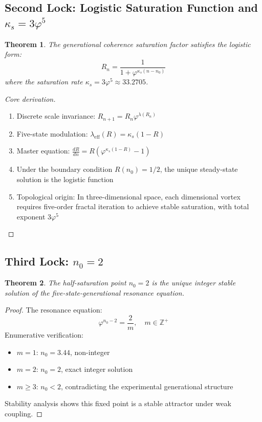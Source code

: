 \documentclass[12pt,a4paper,twocolumn]{article}
\renewcommand{\phi}{\varphi}
\newtheorem{theorem}{Theorem}[section]
\begin{document}
\subsection{Second Lock: Logistic Saturation Function and $\kappa_s=3\phi^5$}
\begin{theorem}
The generational coherence saturation factor satisfies the logistic form:
\[
R_n = \frac{1}{1+\phi^{\kappa_s(n-n_0)}}
\]
where the saturation rate $\kappa_s = 3\phi^5 \approx 33.2705$.
\end{theorem}

\begin{proof}[Core derivation]
\begin{enumerate}
\item Discrete scale invariance: $R_{n+1} = R_n \phi^{\lambda(R_n)}$
\item Five-state modulation: $\lambda_{\text{eff}}(R) = \kappa_s(1-R)$
\item Master equation: $\displaystyle \frac{dR}{dn} = R(\phi^{\kappa_s(1-R)}-1)$
\item Under the boundary condition $R(n_0)=1/2$, the unique steady-state solution is the logistic function
\item Topological origin: In three-dimensional space, each dimensional vortex requires five-order fractal iteration to achieve stable saturation, with total exponent $3\phi^5$
\end{enumerate}
\end{proof}

\subsection{Third Lock: $n_0=2$}
\begin{theorem}
The half-saturation point $n_0=2$ is the unique integer stable solution of the five-state-generational resonance equation.
\end{theorem}

\begin{proof}
The resonance equation:
\[
\phi^{n_0-2} = \frac{2}{m},\quad m\in\mathbb{Z}^+
\]
Enumerative verification:
\begin{itemize}
\item $m=1$: $n_0=3.44$, non-integer
\item $m=2$: $n_0=2$, exact integer solution
\item $m\ge3$: $n_0<2$, contradicting the experimental generational structure
\end{itemize}
Stability analysis shows this fixed point is a stable attractor under weak coupling.
\end{proof}
\end{document}
